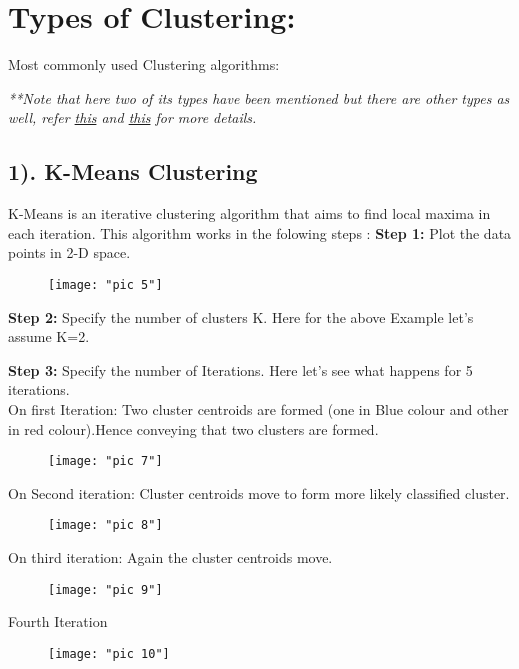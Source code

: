\documentclass[Proceedings]{ascelike}
\begin{document}
\section{Types of Clustering:}
\vspace{3mm}
Most commonly used Clustering algorithms:\\
{{\small\textit{**Note that here two of its types have been mentioned but there are other types as well, refer \href{https://home.deib.polimi.it/matteucc/Clustering/tutorial_html/index.html}{this} and \href{https://www.analyticsvidhya.com/blog/2013/11/getting-clustering-right/}{this} for more details.}}
\subsection{1). K-Means Clustering}
K-Means is an iterative clustering algorithm that aims to find local maxima in each iteration. This algorithm works in the folowing steps :
\newpage
\textbf{Step 1:} Plot the data points in 2-D space.
\begin{figure}[!htb]
	\centering
	\texttt{[image: "pic 5"]}
	\caption{}
	\label{fig:pic-5}
\end{figure}

\textbf{Step 2:} Specify the number of clusters K. Here for the above Example let's assume K=2.

\textbf{Step 3:} Specify the number of Iterations. Here let's see what happens for 5 iterations.\\
\newpage
On first Iteration: Two cluster centroids are formed (one in Blue colour and other in  red colour).Hence conveying that two clusters are formed.
\begin{figure}[!ht]
	\centering
	\texttt{[image: "pic 7"]}
	\caption{}
	\label{fig:pic-6}
\end{figure}

On Second iteration: Cluster centroids move to form more likely classified cluster.
\begin{figure}[!ht]
	\centering
	\texttt{[image: "pic 8"]}
	\caption{}
	\label{fig:pic-8}
\end{figure}
\newpage
On third iteration: Again the cluster centroids move.
\begin{figure}[!ht]
	\centering
	\texttt{[image: "pic 9"]}
	\caption{}
	\label{fig:pic-9}
\end{figure}

Fourth Iteration
\begin{figure}[!ht]
	\centering
	\texttt{[image: "pic 10"]}
	\caption{}
	\label{fig:pic-9}
\end{figure}

}
\end{document}
